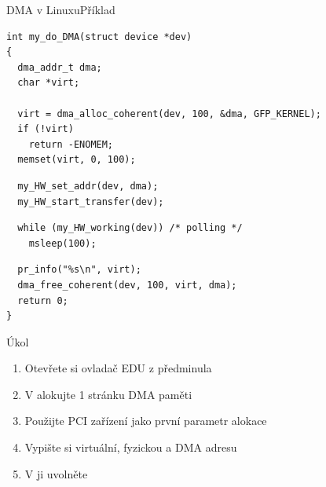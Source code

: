 \begin{frame}[fragile]{DMA v Linuxu}{Příklad}

  \begin{lstlisting}
int my_do_DMA(struct device *dev)
{
  dma_addr_t dma;
  char *virt;

  virt = dma_alloc_coherent(dev, 100, &dma, GFP_KERNEL);
  if (!virt)
    return -ENOMEM;
  memset(virt, 0, 100);
  \end{lstlisting} %
  \pause
  \begin{lstlisting}
  my_HW_set_addr(dev, dma);
  my_HW_start_transfer(dev);
  \end{lstlisting} %
  \pause
  \begin{lstlisting}
  while (my_HW_working(dev)) /* polling */
    msleep(100);
  \end{lstlisting} %
  \pause
  \begin{lstlisting}
  pr_info("%s\n", virt);
  dma_free_coherent(dev, 100, virt, dma);
  return 0;
}
  \end{lstlisting} %

\end{frame}

\begin{frame}{Úkol}

  \begin{enumerate}
    \iffimuni
      \item Otevřete si ovladač EDU z předminula
    \fi
    \item V  alokujte 1 stránku DMA paměti
    \item Použijte PCI zařízení jako první parametr alokace
    \item Vypište si virtuální, fyzickou a DMA adresu
    \item V  ji uvolněte
  \end{enumerate}

\end{frame}

